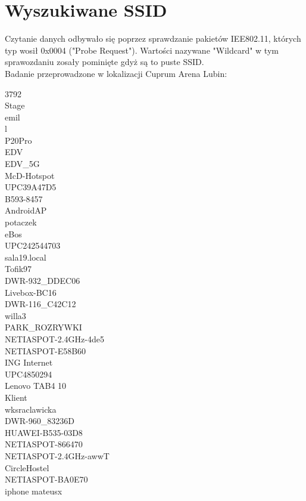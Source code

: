 \documentclass[12pt,a4paper]{article}
\begin{document}
    \section{Wyszukiwane SSID}
        Czytanie danych odbywało się poprzez sprawdzanie pakietów IEE802.11, których typ wosił 0x0004 ("Probe Request"). 
        Wartości nazywane "Wildcard" w tym sprawozdaniu zosały pominięte gdyż są to puste SSID.\\
        Badanie przeprowadzone w lokalizacji Cuprum Arena Lubin:\\
        \begin{small}
            \begin{multicols}{3}
                3792\\Stage\\emil\\l\\P20Pro\\EDV\\EDV\_5G\\McD-Hotspot\\UPC39A47D5\\B593-8457\\AndroidAP\\
                potaczek\\eBos\\UPC242544703\\sala19.local\\Tofik97\\DWR-932\_DDEC06\\
                Livebox-BC16\\DWR-116\_C42C12\\willa3\\PARK\_ROZRYWKI\\NETIASPOT-2.4GHz-4de5\\NETIASPOT-E58B60\\
                ING Internet\\UPC4850294\\Lenovo TAB4 10\\Klient\\wksraclawicka\\DWR-960\_83236D\\HUAWEI-B535-03D8\\
                NETIASPOT-866470\\NETIASPOT-2.4GHz-awwT\\CircleHostel\\NETIASPOT-BA0E70\\iphone mateusx\\

\end{multicols}
\end{small}
\end{document}
